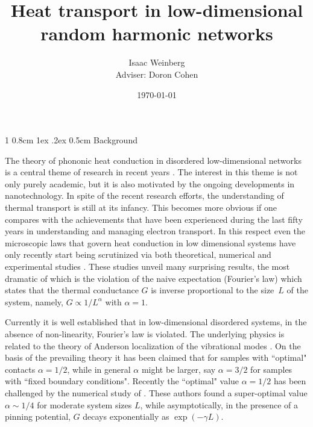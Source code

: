 \documentclass[onecolumn,fleqn,notitlepage,secnumarabic]{revtex4}
\makeatletter
\def\section{%
  \@startsection
    {section}%
    {1}%
    {\z@}%
    {0.8cm \@plus1ex \@minus .2ex}%
    {0.5cm}%
    {\Large\bf }%
}%
\makeatother
\begin{document}
\title{Heat transport in low-dimensional random harmonic networks}


\author{ Isaac Weinberg\\Adviser: Doron Cohen }
\date{\today}
\maketitle

\section{Background}

The theory of phononic heat conduction in disordered low-dimensional networks is a central theme of research in recent years \cite{LLP03,
D08,LRWZHL12}. The interest in this theme is not only purely academic, but it is also motivated by the ongoing developments in nanotechnology.
In spite of the recent research efforts, the understanding of thermal transport is still at its infancy. This becomes more obvious if one compares 
with the achievements that have been experienced during the last fifty years in understanding and managing electron transport. In this respect 
even the microscopic laws that govern heat conduction in low dimensional systems have only recently start being scrutinized via both theoretical, 
numerical and experimental studies \cite{LLP03,D08,COGMZ08,NGPB09,LRWZHL12,ZL10,K1,K2}. These studies unveil many surprising results, the most 
dramatic of which is the violation of the naive expectation (Fourier's law) which states that the thermal conductance $G$ is inverse proportional 
to the size~$L$ of the system, namely, $G\propto 1/L^{\alpha}$ with ${\alpha=1}$. 

Currently it is well established that in low-dimensional disordered systems, in the absence of non-linearity, Fourier's law  is violated. The
underlying physics is related to the theory of Anderson localization of the vibrational modes \cite{D08,D01,LXXZL12,DL08,LD05,RD08,LZH01,
KCRDLS10a,KCRDLS10b}. On the basis of the prevailing theory \cite{D08,D01} it has been claimed that for samples with ``optimal" contacts ${\alpha=1/2}$, 
while in general $\alpha$ might be larger, say ${\alpha=3/2}$ for samples with ``fixed boundary conditions". Recently the ``optimal" value 
${\alpha=1/2}$ has been challenged by the numerical study of \cite{BZFK13}. These authors found a super-optimal value ${\alpha \sim 1/4}$ for 
moderate system sizes $L$, while asymptotically, in the presence of a pinning potential, $G$ decays exponentially as ${\exp(-\gamma L)}$. 
\end{document}
